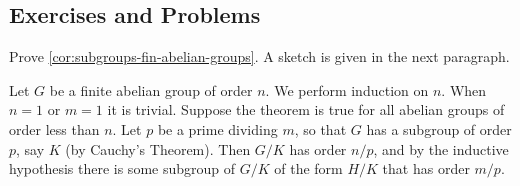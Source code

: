 \documentclass[./main.tex]{subfiles}
\begin{document}
\subsection{Exercises and Problems}

\begin{exercise}
\label{ex:subgroups-fin-abelian-groups}
Prove \cref{cor:subgroups-fin-abelian-groups}. A sketch is given in the next paragraph.

Let $G$ be a finite abelian group of order $n$. We perform induction on $n$.
When $n=1$ or $m=1$ it is trivial. Suppose the theorem is true for all abelian
groups of order less than $n$. Let $p$ be a prime dividing $m$, so that $G$ has
a subgroup of order $p$, say $K$ (by Cauchy's Theorem). Then $G/K$ has order
$n/p$, and by the inductive hypothesis there is some subgroup of $G/K$ of the
form $H/K$ that has order $m/p$.
\end{exercise}
\end{document}

